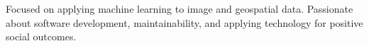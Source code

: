 Focused on applying machine learning to image and geospatial data. Passionate about software development, maintainability, and applying technology for positive social outcomes.
